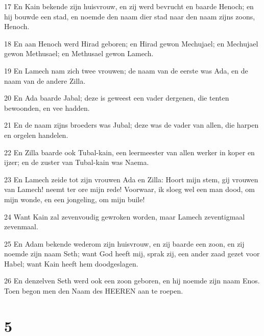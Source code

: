 \par 17 En Kain bekende zijn huisvrouw, en zij werd bevrucht en baarde Henoch; en hij bouwde een stad, en noemde den naam dier stad naar den naam zijns zoons, Henoch.
\par 18 En aan Henoch werd Hirad geboren; en Hirad gewon Mechujael; en Mechujael gewon Methusael; en Methusael gewon Lamech.
\par 19 En Lamech nam zich twee vrouwen; de naam van de eerste was Ada, en de naam van de andere Zilla.
\par 20 En Ada baarde Jabal; deze is geweest een vader dergenen, die tenten bewoonden, en vee hadden.
\par 21 En de naam zijns broeders was Jubal; deze was de vader van allen, die harpen en orgelen handelen.
\par 22 En Zilla baarde ook Tubal-kain, een leermeester van allen werker in koper en ijzer; en de zuster van Tubal-kain was Naema.
\par 23 En Lamech zeide tot zijn vrouwen Ada en Zilla: Hoort mijn stem, gij vrouwen van Lamech! neemt ter ore mijn rede! Voorwaar, ik sloeg wel een man dood, om mijn wonde, en een jongeling, om mijn buile!
\par 24 Want Kain zal zevenvoudig gewroken worden, maar Lamech zeventigmaal zevenmaal.
\par 25 En Adam bekende wederom zijn huisvrouw, en zij baarde een zoon, en zij noemde zijn naam Seth; want God heeft mij, sprak zij, een ander zaad gezet voor Habel; want Kain heeft hem doodgeslagen.
\par 26 En denzelven Seth werd ook een zoon geboren, en hij noemde zijn naam Enos. Toen begon men den Naam des HEEREN aan te roepen.

\chapter{5}

